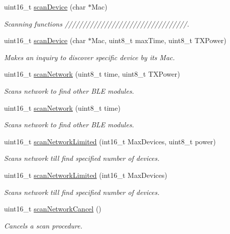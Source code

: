 \begin{DoxyCompactItemize}
uint16\+\_\+t \hyperlink{class_wasp_b_l_e_a52bf458c345c8eee05cbcb66491b3618}{scan\+Device} (char $\ast$Mac)
\begin{DoxyCompactList}\small\item\em Scanning functions //////////////////////////////////. \end{DoxyCompactList}\item 
uint16\+\_\+t \hyperlink{class_wasp_b_l_e_ad11e0716c56e05ca039661341b1d71e4}{scan\+Device} (char $\ast$Mac, uint8\+\_\+t max\+Time, uint8\+\_\+t T\+X\+Power)
\begin{DoxyCompactList}\small\item\em Makes an inquiry to discover specific device by its Mac. \end{DoxyCompactList}\item 
uint16\+\_\+t \hyperlink{class_wasp_b_l_e_aa66176a4a5b4d572b7656ba36db7bb9b}{scan\+Network} (uint8\+\_\+t time, uint8\+\_\+t T\+X\+Power)
\begin{DoxyCompactList}\small\item\em Scans network to find other B\+LE modules. \end{DoxyCompactList}\item 
uint16\+\_\+t \hyperlink{class_wasp_b_l_e_aba60496e707abf40125289a7db2e139b}{scan\+Network} (uint8\+\_\+t time)
\begin{DoxyCompactList}\small\item\em Scans network to find other B\+LE modules. \end{DoxyCompactList}\item 
uint16\+\_\+t \hyperlink{class_wasp_b_l_e_ab45501a0e68b6d20fd59a4a5e872acc8}{scan\+Network\+Limited} (int16\+\_\+t Max\+Devices, uint8\+\_\+t power)
\begin{DoxyCompactList}\small\item\em Scans network till find specified number of devices. \end{DoxyCompactList}\item 
uint16\+\_\+t \hyperlink{class_wasp_b_l_e_a408982f54190cae5eca576cfadfdc078}{scan\+Network\+Limited} (int16\+\_\+t Max\+Devices)
\begin{DoxyCompactList}\small\item\em Scans network till find specified number of devices. \end{DoxyCompactList}\item 
uint16\+\_\+t \hyperlink{class_wasp_b_l_e_a9083b58199f7e32becd1cbd396aafeef}{scan\+Network\+Cancel} ()
\begin{DoxyCompactList}\small\item\em Cancels a scan procedure. \end{DoxyCompactList}\item 

\end{DoxyCompactItemize}
